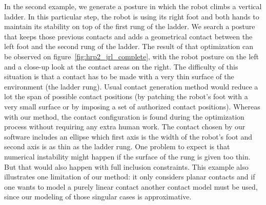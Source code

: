 In the second example, we generate a posture in which the robot climbs a vertical ladder.
In this particular step, the robot is using its right foot and both hands to maintain its stability on top of the first rung of the ladder.
We search a posture that keeps those previous contacts and adds a geometrical contact between the left foot and the second rung of the ladder.
The result of that optimization can be observed on figure~\ref{fig:hrp2_jrl_complete}, with the robot posture on the left and a close-up look at the contact areas on the right.
The difficulty of this situation is that a contact has to be made with a very thin surface of the environment (the ladder rung).
Usual contact generation method would reduce a lot the span of possible contact positions (by patching the robot's foot with a very small surface or by imposing a set of authorized contact positions).
Whereas with our method, the contact configuration is found during the optimization process without requiring any extra human work.
The contact chosen by our software includes an ellipse which first axis is the width of the robot's foot and second axis is as thin as the ladder rung.
One problem to expect is that numerical instability might happen if the surface of the rung is given too thin.
But that would also happen with full inclusion constraints.
This example also illustrates one limitation of our method: it only considers planar contacts and if one wants to model a purely linear contact another contact model must be used, since our modeling of those singular cases is approximative.


%



